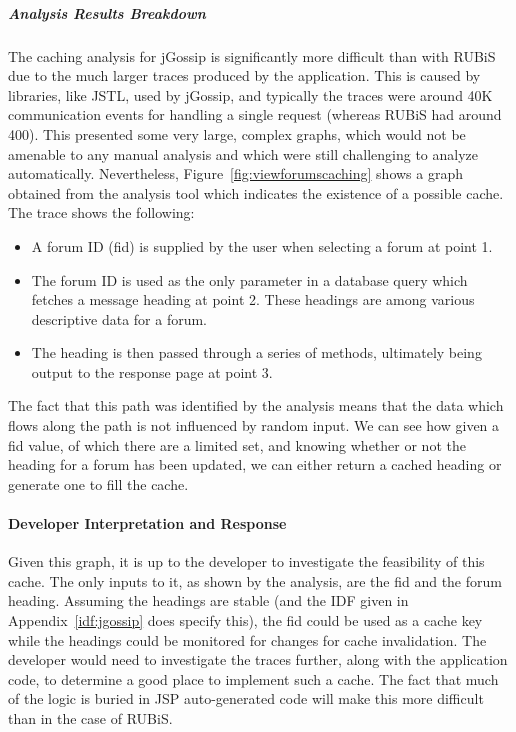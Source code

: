 \documentclass[msc,oneside]{ubcthesis}
\begin{document}
\subparagraph{Analysis Results Breakdown}
The caching analysis for jGossip is significantly more difficult than with RUBiS due to the much larger traces produced by the application. This is caused by libraries, like JSTL, used by jGossip, and typically the traces were around 40K communication events for handling a single request (whereas RUBiS had around 400). This presented some very large, complex graphs, which would not be amenable to any manual analysis and which were still challenging to analyze automatically. Nevertheless, Figure~\ref{fig:viewforumscaching} shows a graph obtained from the analysis tool which indicates the existence of a possible cache.\\

The trace shows the following:
\begin{itemize}
\item A forum ID (fid) is supplied by the user when selecting a forum at point 1.
\item The forum ID is used as the only parameter in a database query which fetches a message heading at point 2. These headings are among various descriptive data for a forum.
\item The heading is then passed through a series of methods, ultimately being output to the response page at point 3.
\end{itemize}

The fact that this path was identified by the analysis means that the data which flows along the path is not influenced by random input. We can see how given a fid value, of which there are a limited set, and knowing whether or not the heading for a forum has been updated, we can either return a cached heading or generate one to fill the cache.

\paragraph{Developer Interpretation and Response}
Given this graph, it is up to the developer to investigate the feasibility of this cache. The only inputs to it, as shown by the analysis, are the fid and the forum heading. Assuming the headings are stable (and the IDF given in Appendix~\ref{idf:jgossip} does specify this), the fid could be used as a cache key while the headings could be monitored for changes for cache invalidation. The developer would need to investigate the traces further, along with the application code, to determine a good place to implement such a cache. The fact that much of the logic is buried in JSP auto-generated code will make this more difficult than in the case of RUBiS.
\end{document}
